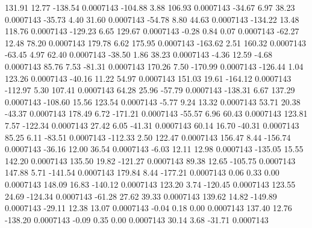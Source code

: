       131.91       12.77     -138.54     0.0007143
     -104.88        3.88      106.93     0.0007143
      -34.67        6.97       38.23     0.0007143
      -35.73        4.40       31.60     0.0007143
      -54.78        8.80       44.63     0.0007143
     -134.22       13.48      118.76     0.0007143
     -129.23        6.65      129.67     0.0007143
       -0.28        0.84        0.07     0.0007143
      -62.27       12.48       78.20     0.0007143
      179.78        6.62      175.95     0.0007143
     -163.62        2.51      160.32     0.0007143
      -63.45        4.97       62.40     0.0007143
      -38.50        1.86       38.23     0.0007143
       -4.36       12.59       -4.68     0.0007143
       85.76        7.53      -81.31     0.0007143
      170.26        7.50     -170.99     0.0007143
     -126.44        1.04      123.26     0.0007143
      -40.16       11.22       54.97     0.0007143
      151.03       19.61     -164.12     0.0007143
     -112.97        5.30      107.41     0.0007143
       64.28       25.96      -57.79     0.0007143
     -138.31        6.67      137.29     0.0007143
     -108.60       15.56      123.54     0.0007143
       -5.77        9.24       13.32     0.0007143
       53.71       20.38      -43.37     0.0007143
      178.49        6.72     -171.21     0.0007143
      -55.57        6.96       60.43     0.0007143
      123.81        7.57     -122.34     0.0007143
       27.42        6.05      -41.31     0.0007143
       60.14       16.70      -40.31     0.0007143
       85.25        6.11      -83.51     0.0007143
     -112.33        2.50      122.47     0.0007143
      156.47        8.44     -156.74     0.0007143
      -36.16       12.00       36.54     0.0007143
       -6.03       12.11       12.98     0.0007143
     -135.05       15.55      142.20     0.0007143
      135.50       19.82     -121.27     0.0007143
       89.38       12.65     -105.75     0.0007143
      147.88        5.71     -141.54     0.0007143
      179.84        8.44     -177.21     0.0007143
        0.06        0.33        0.00     0.0007143
      148.09       16.83     -140.12     0.0007143
      123.20        3.74     -120.45     0.0007143
      123.55       24.69     -124.34     0.0007143
      -61.28       27.62       39.33     0.0007143
      139.62       14.82     -149.89     0.0007143
      -29.11       12.38       13.07     0.0007143
       -0.04        0.18        0.00     0.0007143
      137.40       12.76     -138.20     0.0007143
       -0.09        0.35        0.00     0.0007143
       30.14        3.68      -31.71     0.0007143
